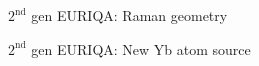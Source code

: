 \documentclass{beamer}
\begin{document}

\begin{frame}{$2^{\text{nd}}$ gen EURIQA: Raman geometry}
  \begin{center}
    \begin{tikzpicture}
    \end{tikzpicture}
  \end{center}
\end{frame}



\begin{frame}{$2^{\text{nd}}$ gen EURIQA: New Yb atom source}
  \begin{center}
    \begin{tikzpicture}
    \end{tikzpicture}
  \end{center}
\end{frame}

\end{document}
